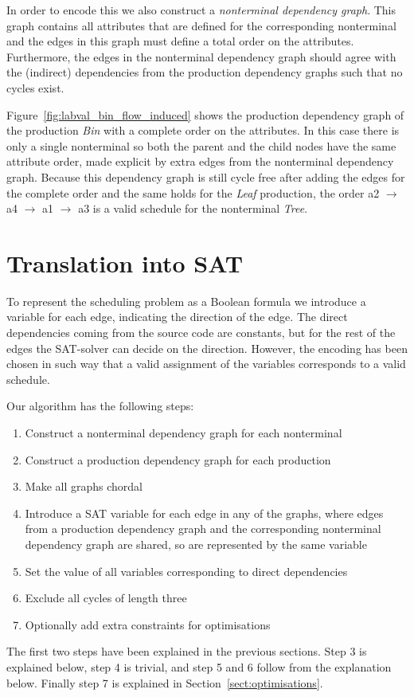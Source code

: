 \documentclass{llncs}
\newcommand{\figref}[1]{Figure~\ref{#1}}
\newcommand{\sectref}[1]{Section~\ref{#1}}
\begin{document}
In order to encode this we also construct a \emph{nonterminal dependency graph}. This graph contains all attributes that are defined for the corresponding nonterminal and the edges in this graph must define a total order on the attributes. Furthermore, the edges in the nonterminal dependency graph should agree with the (indirect) dependencies from the production dependency graphs such that no cycles exist.


\figref{fig:labval_bin_flow_induced} shows the production dependency graph of the production \emph{Bin} with a complete order on the attributes. In this case there is only a single nonterminal so both the parent and the child nodes have the same attribute order, made explicit by extra edges from the nonterminal dependency graph. Because this dependency graph is still cycle free after adding the edges for the complete order and the same holds for the \emph{Leaf} production, the order a2 $\rightarrow$ a4 $\rightarrow$ a1 $\rightarrow$ a3 is a valid schedule for the nonterminal \emph{Tree}.


\section{Translation into SAT} \label{sect:translation}
To represent the scheduling problem as a Boolean formula we introduce a variable for each edge, indicating the direction of the edge. The direct dependencies coming from the source code are constants, but for the rest of the edges the SAT-solver can decide on the direction. However, the encoding has been chosen in such way that a valid assignment of the variables corresponds to a valid schedule.

Our algorithm has the following steps:
\begin{enumerate}
\item Construct a nonterminal dependency graph for each nonterminal
\item Construct a production dependency graph for each production
\item Make all graphs chordal
\item Introduce a SAT variable for each edge in any of the graphs, where edges from a production dependency graph and the corresponding nonterminal dependency graph are shared, so are represented by the same variable
\item Set the value of all variables corresponding to direct dependencies
\item Exclude all cycles of length three
\item Optionally add extra constraints for optimisations
\end{enumerate}
The first two steps have been explained in the previous sections. Step 3 is explained below, step 4 is trivial, and step 5 and 6 follow from the explanation below. Finally step 7 is explained in \sectref{sect:optimisations}.
\end{document}
